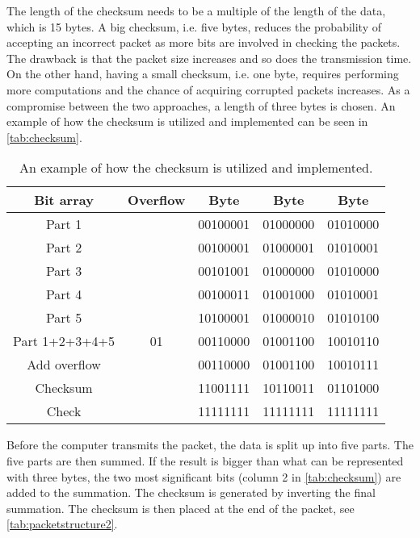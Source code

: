 The length of the checksum needs to be a multiple of the length of the data, which is 15 bytes. A big checksum, i.e. five bytes, reduces the probability of accepting an incorrect packet as more bits are involved in checking the packets. The drawback is that the packet size increases and so does the transmission time. On the other hand, having a small checksum, i.e. one byte, requires performing more computations and the chance of acquiring corrupted packets increases. As a compromise between the two approaches, a length of three bytes is chosen. An example of how the checksum is utilized and implemented can be seen in \autoref{tab:checksum}.  

\begin{table}[H]
    \centering
    \begin{tabular}{|c|c|c|c|c|}
        \hline
        Bit array      & Overflow   & Byte 	   & Byte 	  & Byte		 \\ \hline
        Part 1         & 		    & 00100001 & 01000000 & 01010000    \\ \hline
        Part 2         & 		    & 00100001 & 01000001 & 01010001    \\ \hline
        Part 3         & 		    & 00101001 & 01000000 & 01010000    \\ \hline
        Part 4         & 		    & 00100011 & 01001000 & 01010001    \\ \hline
        Part 5         & 		    & 10100001 & 01000010 & 01010100    \\ \hline
        Part 1+2+3+4+5 & 01	        & 00110000 & 01001100 & 10010110 	 \\ \hline
        Add overflow   & 		    & 00110000 & 01001100 & 10010111    \\ \hline
        Checksum       & 		    & 11001111 & 10110011 & 01101000    \\ \hline
        Check          & 		    & 11111111 & 11111111 & 11111111    \\ \hline
    \end{tabular}
    \caption{An example of how the checksum is utilized and implemented.}
    \label{tab:checksum}
\end{table}

Before the computer transmits the packet, the data is split up into five parts. The five parts are then summed. If the result is bigger than what can be represented with three bytes, the two most significant bits (column 2 in \autoref{tab:checksum}) are added to the summation. The checksum is generated by inverting the final summation. The checksum is then placed at the end of the packet, see \autoref{tab:packetstructure2}.


